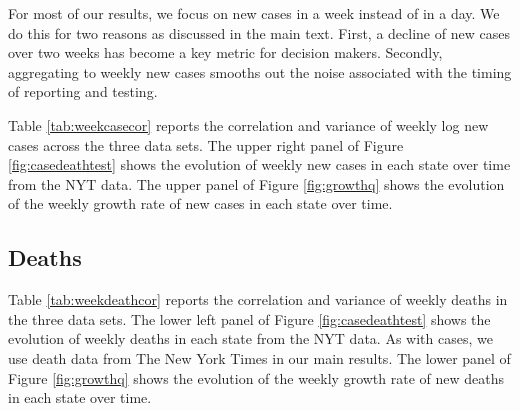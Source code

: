\documentclass[11pt,reqno,letter]{amsart}
\theoremstyle{definition}
\begin{document}



For most of our results, we focus on new cases in a week instead of in
a day. We do this for two reasons as discussed in the main text. First, a decline of new cases over
two weeks has become a key metric for decision makers. Secondly, aggregating to weekly new cases smooths out the noise associated with  the timing of
reporting and testing.

Table \ref{tab:weekcasecor} reports the correlation and variance of
weekly log new cases across the three data sets. The upper right panel of Figure
\ref{fig:casedeathtest} shows the evolution of weekly new cases in each
state over time  from the NYT data. The upper panel of Figure \ref{fig:growthq} shows the evolution of the weekly growth rate of new cases in each
state over time.




\subsection{Deaths}

Table \ref{tab:weekdeathcor} reports the correlation and variance of
weekly deaths in the three data sets. The lower left panel of Figure \ref{fig:casedeathtest}
shows the evolution of weekly deaths in each state from the NYT data. As with cases, we
use death data from The New York Times in our main results. The lower panel of Figure \ref{fig:growthq} shows the evolution of the weekly growth rate of new deaths in each
state over time.
\end{document}
